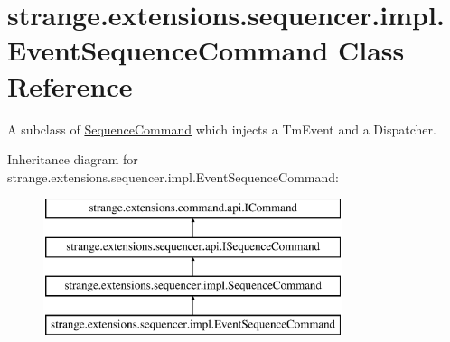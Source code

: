 \hypertarget{classstrange_1_1extensions_1_1sequencer_1_1impl_1_1_event_sequence_command}{\section{strange.\-extensions.\-sequencer.\-impl.\-Event\-Sequence\-Command Class Reference}
\label{classstrange_1_1extensions_1_1sequencer_1_1impl_1_1_event_sequence_command}
}


A subclass of \hyperlink{classstrange_1_1extensions_1_1sequencer_1_1impl_1_1_sequence_command}{Sequence\-Command} which injects a Tm\-Event and a Dispatcher.  


Inheritance diagram for strange.\-extensions.\-sequencer.\-impl.\-Event\-Sequence\-Command\-:\begin{figure}[H]
\begin{center}
\leavevmode
\includegraphics[height=4.000000cm]{classstrange_1_1extensions_1_1sequencer_1_1impl_1_1_event_sequence_command}
\end{center}
\end{figure}
